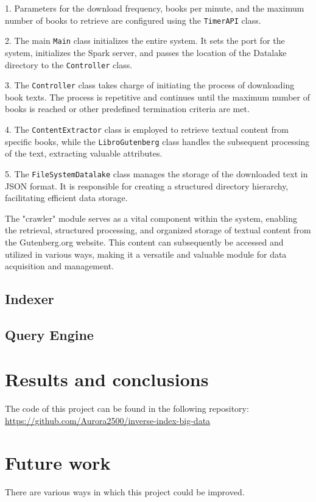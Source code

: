 \documentclass{article}
\begin{document}
1. Parameters for the download frequency, books per minute, and the maximum number of books to retrieve are configured using the \texttt{TimerAPI} class.

2. The main \texttt{Main} class initializes the entire system. It sets the port for the system, initializes the Spark server, and passes the location of the Datalake directory to the \texttt{Controller} class.

3. The \texttt{Controller} class takes charge of initiating the process of downloading book texts. The process is repetitive and continues until the maximum number of books is reached or other predefined termination criteria are met.

4. The \texttt{ContentExtractor} class is employed to retrieve textual content from specific books, while the \texttt{LibroGutenberg} class handles the subsequent processing of the text, extracting valuable attributes.

5. The \texttt{FileSystemDatalake} class manages the storage of the downloaded text in JSON format. It is responsible for creating a structured directory hierarchy, facilitating efficient data storage.

The "crawler" module serves as a vital component within the system, enabling the retrieval, structured processing, and organized storage of textual content from the Gutenberg.org website. This content can subsequently be accessed and utilized in various ways, making it a versatile and valuable module for data acquisition and management.

\subsection{Indexer}
\subsection{Query Engine}


\section{Results and conclusions}


The code of this project can be found in the following repository: \url{https://github.com/Aurora2500/inverse-index-big-data}

\section{Future work}

There are various ways in which this project could be improved.
\end{document}
